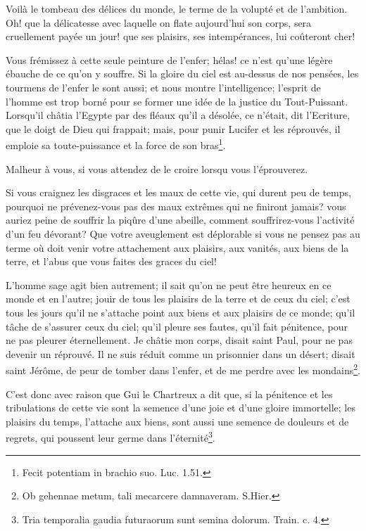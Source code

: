 \documentclass[instructions.tex]{subfiles}
\begin{document}
Voilà le tombeau des délices du monde, le terme de la volupté et de l'ambition. Oh! que la délicatesse avec laquelle on flate aujourd'hui son corps, sera cruellement payée un jour! que ses plaisirs, ses intempérances, lui coûteront cher!

Vous frémissez à cette seule peinture de l'enfer; hélas! ce n'est qu'une légère ébauche de ce qu'on y souffre. Si la gloire du ciel est au-dessus de nos pensées, les tourmens de l'enfer le sont aussi; et nous montre l'intelligence; l'esprit de l'homme est trop borné pour se former une idée de la justice du Tout-Puissant. Lorsqu'il châtia l'Egypte par des fléaux qu'il a désolée, ce n'était, dit l'Ecriture, que le doigt de Dieu qui frappait; mais, pour punir Lucifer et les réprouvés, il emploie sa toute-puissance et la force de son bras\footnote{Fecit potentiam in brachio suo. Luc. 1.51.}.

Malheur à vous, si vous attendez de le croire lorsqu vous l'éprouverez.

Si vous craignez les disgraces et les maux de cette vie, qui durent peu de temps, pourquoi ne prévenez-vous pas des maux extrêmes qui ne finiront jamais? vous auriez peine de souffrir la piqûre d'une abeille, comment souffrirez-vous l'activité d'un feu dévorant? Que votre aveuglement est déplorable si vous ne pensez pas au terme où doit venir votre attachement aux plaisirs, aux vanités, aux biens de la terre, et l'abus que vous faites des graces du ciel!

L'homme sage agit bien autrement; il sait qu'on ne peut être heureux en ce monde et en l'autre; jouir de tous les plaisirs de la terre et de ceux du ciel; c'est tous les jours qu'il ne s'attache point aux biens et aux plaisirs de ce monde; qu'il tâche de s'assurer ceux du ciel; qu'il pleure ses fautes, qu'il fait pénitence, pour ne pas pleurer éternellement. Je châtie mon corps, disait saint Paul, pour ne pas devenir un réprouvé. Il ne suis réduit comme un prisonnier dans un désert; disait saint Jérôme, de peur de tomber dans l'enfer, et de me perdre avec les mondains\footnote{Ob gehennae metum, tali mecarcere damnaveram. S.Hier.}.

C'est donc avec raison que Gui le Chartreux a dit que, si la pénitence et les tribulations de cette vie sont la semence d'une joie et d'une gloire immortelle; les plaisirs du temps, l'attache aux biens, sont aussi une semence de douleurs et de regrets, qui poussent leur germe dans l'éternité\footnote{Tria temporalia gaudia futuraorum sunt semina dolorum. Train. c. 4.}.
\end{document}
